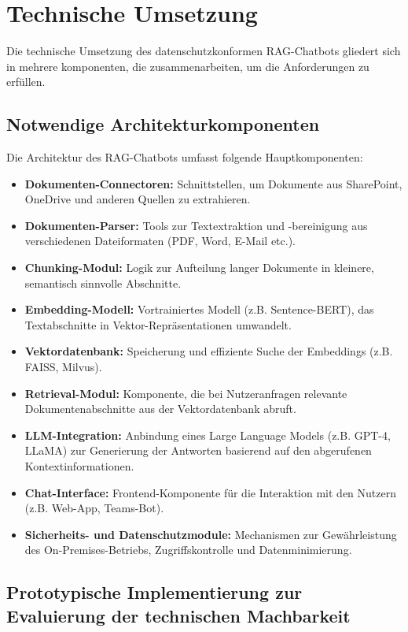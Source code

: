 \newpage
\section{Technische Umsetzung}\label{sec:technische-umsetzung}
Die technische Umsetzung des datenschutzkonformen RAG-Chatbots gliedert sich in mehrere
komponenten, die zusammenarbeiten, um die Anforderungen zu erfüllen.

\subsection{Notwendige Architekturkomponenten}\label{subsec:notwendige-architekturkomponenten}
Die Architektur des RAG-Chatbots umfasst folgende Hauptkomponenten:
\begin{itemize}
    \item \textbf{Dokumenten-Connectoren:} Schnittstellen, um Dokumente aus SharePoint, OneDrive und anderen Quellen zu extrahieren.
    \item \textbf{Dokumenten-Parser:} Tools zur Textextraktion und -bereinigung aus verschiedenen Dateiformaten (PDF, Word, E-Mail etc.).
    \item \textbf{Chunking-Modul:} Logik zur Aufteilung langer Dokumente in kleinere, semantisch sinnvolle Abschnitte.
    \item \textbf{Embedding-Modell:} Vortrainiertes Modell (z.B. Sentence-BERT), das Textabschnitte in Vektor-Repräsentationen umwandelt.
    \item \textbf{Vektordatenbank:} Speicherung und effiziente Suche der Embeddings (z.B. FAISS, Milvus).
    \item \textbf{Retrieval-Modul:} Komponente, die bei Nutzeranfragen relevante Dokumentenabschnitte aus der Vektordatenbank abruft.
    \item \textbf{LLM-Integration:} Anbindung eines Large Language Models (z.B. GPT-4, LLaMA) zur Generierung der Antworten basierend auf den abgerufenen Kontextinformationen.
    \item \textbf{Chat-Interface:} Frontend-Komponente für die Interaktion mit den Nutzern (z.B. Web-App, Teams-Bot).
    \item \textbf{Sicherheits- und Datenschutzmodule:} Mechanismen zur Gewährleistung des On-Premises-Betriebs, Zugriffskontrolle und Datenminimierung.
\end{itemize}

\subsection{Prototypische Implementierung zur Evaluierung der technischen Machbarkeit}\label{subsec:prototypische-implementierung-zur-evaluierung-der-technischen-machbarkeit}

